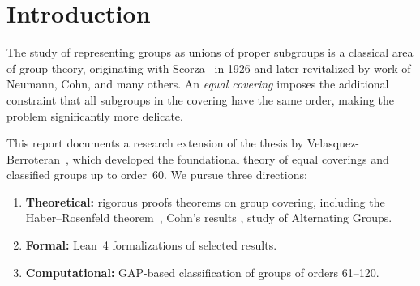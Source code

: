 \documentclass[12pt, a4paper]{article}
\theoremstyle{plain}
\theoremstyle{definition}
\begin{document}
\begin{titlepage}
  \begin{abstract}
    \noindent
An \textbf{equal covering} of a finite group G is a collection of proper subgroups of equal order whose union is G. This report documents a research extension of the work of Velasquez-Berroteran \cite{velasquez2022}, which developed the theory of equal coverings and computationally classified groups up to order 60.
Our work proceeds along three strands. First, we present proofs of several foundational results on group coverings that the paper invokes but does not prove in full situating these within the equal covering framework. Second, we formalize key theorems on equal coverings in Lean 4 using Mathlib, identifying proof-theoretic subtleties along the way. Third, we extend the GAP-based computational classification of groups with equal coverings from order 60 to order 120, producing a complete table of results with supporting theoretical justifications.
Together, these contributions provide a more complete theoretical foundation for the subject, a formal verification layer, and new computational evidence bearing on the open conjecture that no finite simple group admits an equal covering. Furthemore, We attempted a possible direction on proving the conjecture for some Alternating Groups.
  \end{abstract}
\end{titlepage}
\tableofcontents

\newpage

\section{Introduction}
\label{sec:intro}

The study of representing groups as unions of proper subgroups is a classical area of
group theory, originating with Scorza~\cite{scorza1926} in 1926 and later revitalized
by work of Neumann, Cohn, and many others. An \emph{equal covering} imposes the
additional constraint that all subgroups in the covering have the same order, making the
problem significantly more delicate.

This report documents a research extension of the thesis by Velasquez-Berroteran~\cite{velasquez2022},
which developed the foundational theory of equal coverings and classified groups up to
order~60. We pursue three directions:
\begin{enumerate}[label=(\roman*)]
  \item \textbf{Theoretical:} rigorous proofs theorems on group covering, including the
    Haber--Rosenfeld theorem~\cite{haber1959}, Cohn's results \cite{cohn1994}, study of Alternating Groups.
  \item \textbf{Formal:} Lean~4 formalizations of selected results.
  \item \textbf{Computational:} GAP-based classification of groups of orders 61--120.
\end{enumerate}
\end{document}
